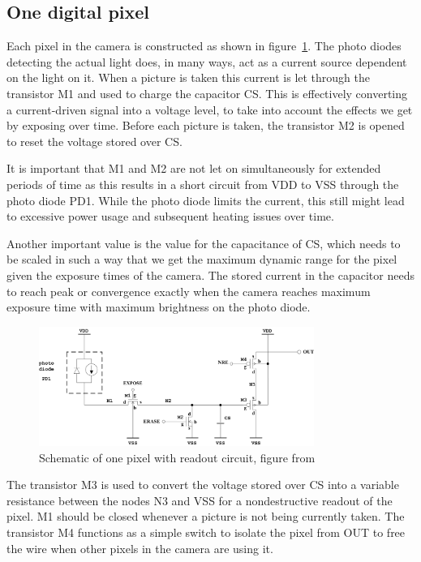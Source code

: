 
\subsection{One digital pixel}\label{sec:oneDigitalPixel}


Each pixel in the camera is constructed as shown in figure~\ref{fig:pixelschematic}.
The photo diodes detecting the actual light does, in many ways, act as a current source dependent on the light on it. When a picture is taken this
current is let through the transistor M1 and used to charge the capacitor CS. This is effectively converting a current-driven signal into a voltage level, to take into account the effects we get by exposing over time.
Before each picture is taken, the transistor M2 is opened to reset the voltage stored over CS.

It is important that M1 and M2 are not let on simultaneously for extended periods of time as this results in a short circuit from VDD to VSS through the photo diode PD1.
While the photo diode limits the current, this still might lead to excessive power usage and subsequent heating issues over time.

Another important value is the value for the capacitance of CS, which needs to be scaled in such a way that we get the maximum dynamic range for the pixel given the exposure times of the camera. The stored current in the capacitor needs to reach peak or convergence exactly when the camera reaches maximum exposure time with maximum brightness on the photo diode.


\begin{figure}[htbp]
  \centering
  \includegraphics[width=0.80\textwidth]{figures/pixel}
  \caption{Schematic of one pixel with readout circuit, figure from~\cite{oppgave}}\label{fig:pixelschematic}
\end{figure}


The transistor M3 is used to convert the voltage stored over CS into a variable resistance between the nodes N3 and VSS for a nondestructive readout of the pixel. M1 should be closed whenever a picture is not being currently taken. The transistor M4 functions as a simple switch to isolate the pixel from OUT to free the wire when other pixels in the camera are using it.


